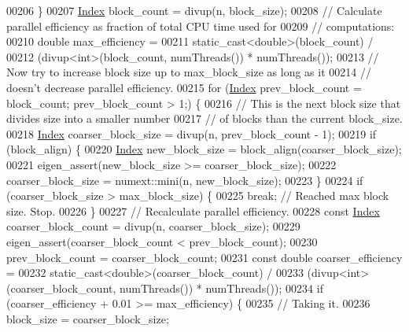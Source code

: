 \begin{DoxyCode}
00206     \}
00207     \hyperlink{namespace_eigen_a62e77e0933482dafde8fe197d9a2cfde}{Index} block\_count = divup(n, block\_size);
00208     \textcolor{comment}{// Calculate parallel efficiency as fraction of total CPU time used for}
00209     \textcolor{comment}{// computations:}
00210     \textcolor{keywordtype}{double} max\_efficiency =
00211         \textcolor{keyword}{static\_cast<}\textcolor{keywordtype}{double}\textcolor{keyword}{>}(block\_count) /
00212         (divup<int>(block\_count, numThreads()) * numThreads());
00213     \textcolor{comment}{// Now try to increase block size up to max\_block\_size as long as it}
00214     \textcolor{comment}{// doesn't decrease parallel efficiency.}
00215     \textcolor{keywordflow}{for} (\hyperlink{namespace_eigen_a62e77e0933482dafde8fe197d9a2cfde}{Index} prev\_block\_count = block\_count; prev\_block\_count > 1;) \{
00216       \textcolor{comment}{// This is the next block size that divides size into a smaller number}
00217       \textcolor{comment}{// of blocks than the current block\_size.}
00218       \hyperlink{namespace_eigen_a62e77e0933482dafde8fe197d9a2cfde}{Index} coarser\_block\_size = divup(n, prev\_block\_count - 1);
00219       \textcolor{keywordflow}{if} (block\_align) \{
00220         \hyperlink{namespace_eigen_a62e77e0933482dafde8fe197d9a2cfde}{Index} new\_block\_size = block\_align(coarser\_block\_size);
00221         eigen\_assert(new\_block\_size >= coarser\_block\_size);
00222         coarser\_block\_size = numext::mini(n, new\_block\_size);
00223       \}
00224       \textcolor{keywordflow}{if} (coarser\_block\_size > max\_block\_size) \{
00225         \textcolor{keywordflow}{break};  \textcolor{comment}{// Reached max block size. Stop.}
00226       \}
00227       \textcolor{comment}{// Recalculate parallel efficiency.}
00228       \textcolor{keyword}{const} \hyperlink{namespace_eigen_a62e77e0933482dafde8fe197d9a2cfde}{Index} coarser\_block\_count = divup(n, coarser\_block\_size);
00229       eigen\_assert(coarser\_block\_count < prev\_block\_count);
00230       prev\_block\_count = coarser\_block\_count;
00231       \textcolor{keyword}{const} \textcolor{keywordtype}{double} coarser\_efficiency =
00232           \textcolor{keyword}{static\_cast<}\textcolor{keywordtype}{double}\textcolor{keyword}{>}(coarser\_block\_count) /
00233           (divup<int>(coarser\_block\_count, numThreads()) * numThreads());
00234       \textcolor{keywordflow}{if} (coarser\_efficiency + 0.01 >= max\_efficiency) \{
00235         \textcolor{comment}{// Taking it.}
00236         block\_size = coarser\_block\_size;

\end{DoxyCode}
